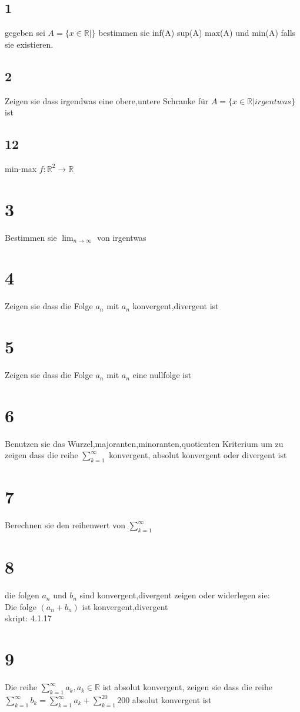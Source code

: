 \documentclass[11pt,oneside,a4paper]{scrartcl}
\begin{document}
\subsection*{1}
gegeben sei $A=\{x\in\mathbb{R}|\}$ bestimmen sie inf(A) sup(A) max(A) und min(A) falls sie existieren.
\subsection*{2}
Zeigen sie dass irgendwas eine obere,untere Schranke f\"ur $A=\{x\in\mathbb{R}| irgentwas\}$ ist\\
\subsection*{12}
min-max $f:\mathbb{R}^2\rightarrow\mathbb{R}$\\ 
\section*{3}
Bestimmen sie $\lim_{n\to\infty}$ von irgentwas%
\section*{4}
Zeigen sie dass die Folge $a_n$ mit $a_n$ konvergent,divergent ist
\section*{5}
Zeigen sie dass die Folge $a_n$ mit $a_n$ eine nullfolge ist
\section*{6}
Benutzen sie das Wurzel,majoranten,minoranten,quotienten Kriterium um zu zeigen dass die reihe $\sum^{\infty}_{k=1}$ konvergent, absolut konvergent oder divergent ist 
\section*{7}
Berechnen sie den reihenwert von  $\sum^{\infty}_{k=1}$

\section*{8}
die folgen $a_n$ und $b_n$ sind konvergent,divergent zeigen oder widerlegen sie:\\
Die folge $(a_n+b_n)$ ist konvergent,divergent\\
skript: 4.1.17
\section*{9}
Die reihe $\sum^{\infty}_{k=1}a_k,a_k\in\mathbb{R}$ ist absolut konvergent, zeigen sie dass die reihe $\sum^{\infty}_{k=1}b_k=\sum^{\infty}_{k=1}a_k+\sum^{20}_{k=1}200$ absolut konvergent ist
\end{document}
